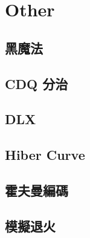 \documentclass[a4paper,10pt,twocolumn,oneside]{article}
\begin{document}
\section{Other}
\subsection{黑魔法}

\subsection{CDQ 分治}

\subsection{DLX}

\subsection{Hiber Curve}

\subsection{霍夫曼編碼}

\subsection{模擬退火}

\end{document}
